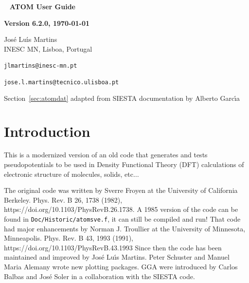\documentclass[11pt]{article}
\begin{document}

\begin{titlepage}

\begin{center}
~
\vfill
\vspace{1cm}
{\Huge {\bf ATOM User Guide}}
\par\vspace{3cm}
\hrulefill
\par\vspace{3cm}
{\Large {\bf Version 6.2.0, \today}}
\par\vspace{2cm}
\hrulefill

{\Large Jos\'e Lu\'{\i}s Martins \\

INESC MN, Lisboa, Portugal

\texttt{jlmartins@inesc-mn.pt}

\texttt{jose.l.martins@tecnico.ulisboa.pt}

\vspace{1cm}
Section~\ref{sec:atomdat} adapted from \textsc{SIESTA} documentation
by Alberto Garc\'{\i}a
}
\vfill
\end{center}

\end{titlepage}

\tableofcontents
\newpage

\section{Introduction}
\label{sec:intro}

This is a modernized version of an old code that generates and tests pseudopotentials to be
used in Density Functional Theory (DFT) calculations of electronic structure of molecules, solids, etc$\ldots$

The original code was written by Sverre Froyen at the University of California Berkeley.
Phys. Rev. B 26, 1738 (1982), https://doi.org/10.1103/PhysRevB.26.1738.  A 1985
version of the code can be found in \texttt{Doc/Historic/atomsve.f},
it can still be compiled and run!
That code had major enhancements by Norman J. Troullier at the University of Minnesota, Minneapolis.
Phys. Rev. B 43, 1993 (1991), https://doi.org/10.1103/PhysRevB.43.1993
Since then the code has been maintained and improved by Jos\'e Lu\'{\i}s Martins.  Peter Schuster and Manuel Maria Alemany
wrote new plotting packages.  GGA were introduced by Carlos Balbas and José Soler in a collaboration
with the SIESTA code.
\end{document}
